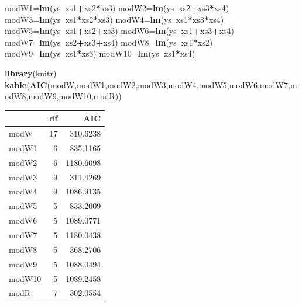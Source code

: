 \documentclass[
]{book}
\newenvironment{Shaded}{\begin{snugshade}}{\end{snugshade}}
\newcommand{\KeywordTok}[1]{\textcolor[rgb]{0.13,0.29,0.53}{\textbf{#1}}}
\newcommand{\NormalTok}[1]{#1}
\newcommand{\OperatorTok}[1]{\textcolor[rgb]{0.81,0.36,0.00}{\textbf{#1}}}
\begin{document}
\begin{Shaded}
\begin{Highlighting}[]
\NormalTok{modW1=}\KeywordTok{lm}\NormalTok{(ys}\OperatorTok{~}\NormalTok{xs1}\OperatorTok{+}\NormalTok{xs2}\OperatorTok{*}\NormalTok{xs3)}
\NormalTok{modW2=}\KeywordTok{lm}\NormalTok{(ys}\OperatorTok{~}\NormalTok{xs2}\OperatorTok{+}\NormalTok{xs3}\OperatorTok{*}\NormalTok{xs4)}
\NormalTok{modW3=}\KeywordTok{lm}\NormalTok{(ys}\OperatorTok{~}\NormalTok{xs1}\OperatorTok{*}\NormalTok{xs2}\OperatorTok{*}\NormalTok{xs3)}
\NormalTok{modW4=}\KeywordTok{lm}\NormalTok{(ys}\OperatorTok{~}\NormalTok{xs1}\OperatorTok{*}\NormalTok{xs3}\OperatorTok{*}\NormalTok{xs4)}
\NormalTok{modW5=}\KeywordTok{lm}\NormalTok{(ys}\OperatorTok{~}\NormalTok{xs1}\OperatorTok{+}\NormalTok{xs2}\OperatorTok{+}\NormalTok{xs3)}
\NormalTok{modW6=}\KeywordTok{lm}\NormalTok{(ys}\OperatorTok{~}\NormalTok{xs1}\OperatorTok{+}\NormalTok{xs3}\OperatorTok{+}\NormalTok{xs4)}
\NormalTok{modW7=}\KeywordTok{lm}\NormalTok{(ys}\OperatorTok{~}\NormalTok{xs2}\OperatorTok{+}\NormalTok{xs3}\OperatorTok{+}\NormalTok{xs4)}
\NormalTok{modW8=}\KeywordTok{lm}\NormalTok{(ys}\OperatorTok{~}\NormalTok{xs1}\OperatorTok{*}\NormalTok{xs2)}
\NormalTok{modW9=}\KeywordTok{lm}\NormalTok{(ys}\OperatorTok{~}\NormalTok{xs1}\OperatorTok{*}\NormalTok{xs3)}
\NormalTok{modW10=}\KeywordTok{lm}\NormalTok{(ys}\OperatorTok{~}\NormalTok{xs1}\OperatorTok{*}\NormalTok{xs4)}
\end{Highlighting}
\end{Shaded}

\begin{Shaded}
\begin{Highlighting}[]
\KeywordTok{library}\NormalTok{(knitr)}
\KeywordTok{kable}\NormalTok{(}\KeywordTok{AIC}\NormalTok{(modW,modW1,modW2,modW3,modW4,modW5,modW6,modW7,modW8,modW9,modW10,modR))}
\end{Highlighting}
\end{Shaded}

\begin{tabular}{l|r|r}
\hline
  & df & AIC\\
\hline
modW & 17 & 310.6238\\
\hline
modW1 & 6 & 835.1165\\
\hline
modW2 & 6 & 1180.6098\\
\hline
modW3 & 9 & 311.4269\\
\hline
modW4 & 9 & 1086.9135\\
\hline
modW5 & 5 & 833.2009\\
\hline
modW6 & 5 & 1089.0771\\
\hline
modW7 & 5 & 1180.0438\\
\hline
modW8 & 5 & 368.2706\\
\hline
modW9 & 5 & 1088.0494\\
\hline
modW10 & 5 & 1089.2458\\
\hline
modR & 7 & 302.0554\\
\hline
\end{tabular}
\end{document}

